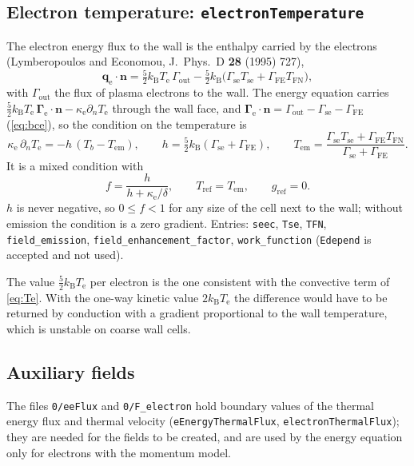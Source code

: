 \documentclass[11pt,a4paper]{article}
\newcommand{\kw}[1]{\texttt{#1}}
\newcommand{\bG}{\boldsymbol{\Gamma}}
\newcommand{\bn}{\mathbf{n}}
\newcommand{\kB}{k_\mathrm{B}}
\newcommand{\Te}{T_\mathrm{e}}
\begin{document}
\subsection{Electron temperature: \kw{electronTemperature}}

The electron energy flux to the wall is the enthalpy carried by the
electrons (Lymberopoulos and Economou, J.~Phys.~D \textbf{28} (1995) 727),
\begin{equation}
\mathbf{q}_\mathrm{e}\cdot\bn = \tfrac52\kB\Te\,\Gamma_\mathrm{out}
 - \tfrac52\kB\big(\Gamma_\mathrm{se}T_\mathrm{se}+\Gamma_\mathrm{FE}T_\mathrm{FN}\big),
\end{equation}
with $\Gamma_\mathrm{out}$ the flux of plasma electrons to the wall. The
energy equation carries
$\tfrac52\kB\Te\,\bG_\mathrm{e}\cdot\bn-\kappa_\mathrm{e}\partial_n\Te$
through the wall face, and
$\bG_\mathrm{e}\cdot\bn=\Gamma_\mathrm{out}-\Gamma_\mathrm{se}-\Gamma_\mathrm{FE}$
(\ref{eq:bce}), so the condition on the temperature is
\begin{equation}
\kappa_\mathrm{e}\,\partial_n\Te = -h\,(T_b-T_\mathrm{em}),\qquad
h=\tfrac52\kB(\Gamma_\mathrm{se}+\Gamma_\mathrm{FE}),\qquad
T_\mathrm{em}=\frac{\Gamma_\mathrm{se}T_\mathrm{se}+\Gamma_\mathrm{FE}T_\mathrm{FN}}
{\Gamma_\mathrm{se}+\Gamma_\mathrm{FE}} .
\end{equation}
It is a mixed condition with
\begin{equation}
f=\frac{h}{h+\kappa_\mathrm{e}/\delta},\qquad T_\mathrm{ref}=T_\mathrm{em},\qquad g_\mathrm{ref}=0 .
\end{equation}
$h$ is never negative, so $0\le f<1$ for any size of the cell next to the
wall; without emission the condition is a zero gradient. Entries:
\kw{seec}, \kw{Tse}, \kw{TFN}, \kw{field\_emission},
\kw{field\_enhancement\_factor}, \kw{work\_function} (\kw{Edepend} is
accepted and not used).

The value $\tfrac52\kB\Te$ per electron is the one consistent with the
convective term of \eqref{eq:Te}. With the one-way kinetic value
$2\kB\Te$ the difference would have to be returned by conduction with a
gradient proportional to the wall temperature, which is unstable on coarse
wall cells.

\subsection{Auxiliary fields}

The files \kw{0/eeFlux} and \kw{0/F\_electron} hold boundary values of the
thermal energy flux and thermal velocity (\kw{eEnergyThermalFlux},
\kw{electronThermalFlux}); they are needed for the fields to be created, and
are used by the energy equation only for electrons with the momentum model.
\end{document}
